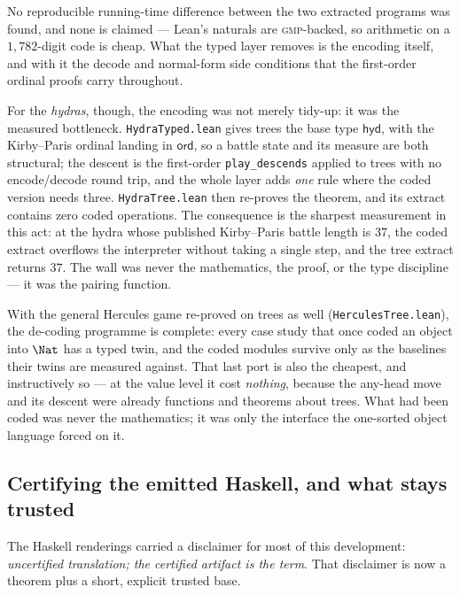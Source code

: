 No reproducible running-time difference between the two extracted programs
was found, and none is claimed --- Lean's naturals are \textsc{gmp}-backed,
so arithmetic on a $1{,}782$-digit code is cheap. What the typed layer
removes is the encoding itself, and with it the decode and normal-form side
conditions that the first-order ordinal proofs carry throughout.

For the \emph{hydras}, though, the encoding was not merely tidy-up: it was
the measured bottleneck. \texttt{HydraTyped.lean} gives trees the base type
$\mathsf{hyd}$, with the Kirby--Paris ordinal landing in $\mathsf{ord}$, so
a battle state and its measure are both structural; the descent is the
first-order \texttt{play\_descends} applied to trees with no encode/decode
round trip, and the whole layer adds \emph{one} rule where the coded version
needs three. \texttt{HydraTree.lean} then re-proves the theorem, and its
extract contains zero coded operations. The consequence is the sharpest
measurement in this act: at the hydra whose published Kirby--Paris battle
length is $37$, the coded extract overflows the interpreter without taking a
single step, and the tree extract returns $37$. The wall was never the
mathematics, the proof, or the type discipline --- it was the pairing
function.

With the general Hercules game re-proved on trees as well
(\texttt{HerculesTree.lean}), the de-coding programme is complete: every
case study that once coded an object into $\Nat$ has a typed twin, and the
coded modules survive only as the baselines their twins are measured
against. That last port is also the cheapest, and instructively so --- at
the value level it cost \emph{nothing}, because the any-head move and its
descent were already functions and theorems about trees. What had been
coded was never the mathematics; it was only the interface the one-sorted
object language forced on it.

\subsection*{Certifying the emitted Haskell, and what stays trusted}

The Haskell renderings carried a disclaimer for most of this development:
\emph{uncertified translation; the certified artifact is the term}. That
disclaimer is now a theorem plus a short, explicit trusted base.

